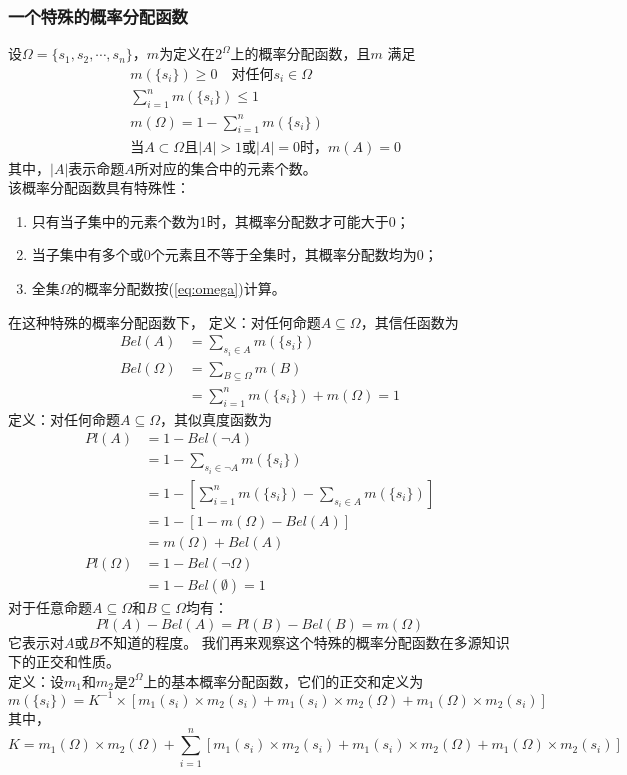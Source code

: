 \documentclass[12pt]{article}
\begin{document}
\subsubsection{一个特殊的概率分配函数}
设$\Omega=\{s_1,s_2,\cdots,s_n\}$，$m$为定义在$2^\Omega$上的概率分配函数，且$m$
满足
\begin{align}
	&m(\{s_i\})\geq 0 \quad  对任何s_i\in\Omega\\
	&\sum\limits_{i=1}^n m(\{s_i\})\leq 1\\
	&m(\Omega)=1-\sum\limits_{i=1}^n m(\{s_i\})\label{eq:omega}\\
	&当A\subset\Omega 且|A|>1或|A|=0时，m(A)=0
\end{align}
其中，$|A|$表示命题$A$所对应的集合中的元素个数。\\
该概率分配函数具有特殊性：
\begin{enumerate}
	\item 只有当子集中的元素个数为1时，其概率分配数才可能大于0；
	\item 当子集中有多个或0个元素且不等于全集时，其概率分配数均为0；
	\item 全集$\Omega$的概率分配数按(\ref{eq:omega})计算。
\end{enumerate}
在这种特殊的概率分配函数下，
定义：对任何命题$A\subseteq\Omega$，其信任函数为
\[
	\begin{aligned}
		Bel(A)&=\sum\limits_{s_i\in A}m(\{s_i\})\\
		Bel(\Omega)&=\sum\limits_{B\subseteq\Omega}m(B)\\
		&=\sum\limits_{i=1}^n m(\{s_i\})+m(\Omega)=1
	\end{aligned}
\]
定义：对任何命题$A\subseteq\Omega$，其似真度函数为
\[
	\begin{aligned}
		Pl(A)&=1-Bel(\neg A)\\
		&=1-\sum\limits_{s_i\in\neg A}m(\{s_i\})\\
		&=1-\left[\sum\limits_{i=1}^n 
		m(\{s_i\})-\sum\limits_{s_i\in A}m(\{s_i\}) \right]\\
		&=1-[1-m(\Omega)-Bel(A)]\\
		&=m(\Omega)+Bel(A)\\
		Pl(\Omega)&=1-Bel(\neg\Omega)\\
		&=1-Bel(\emptyset)=1
	\end{aligned}
\]
对于任意命题$A\subseteq\Omega$和$B\subseteq\Omega$均有：
\[
	Pl(A)-Bel(A)=Pl(B)-Bel(B)=m(\Omega)
\]
它表示对$A$或$B$不知道的程度。
我们再来观察这个特殊的概率分配函数在多源知识下的正交和性质。\\
定义：设$m_1$和$m_2$是$2^\Omega$上的基本概率分配函数，它们的正交和定义为
\[
	m(\{s_i\})=K^{-1}\times[m_1(s_i)\times m_2(s_i)
	+m_1(s_i)\times m_2(\Omega)+m_1(\Omega)\times m_2(s_i)]
\]
其中，
\[
	K=m_1(\Omega)\times m_2(\Omega)+\sum\limits_{i=1}^n 
	[m_1(s_i)\times m_2(s_i)+m_1(s_i)\times m_2(\Omega)
	+m_1(\Omega)\times m_2(s_i)]
\]
\end{document}
